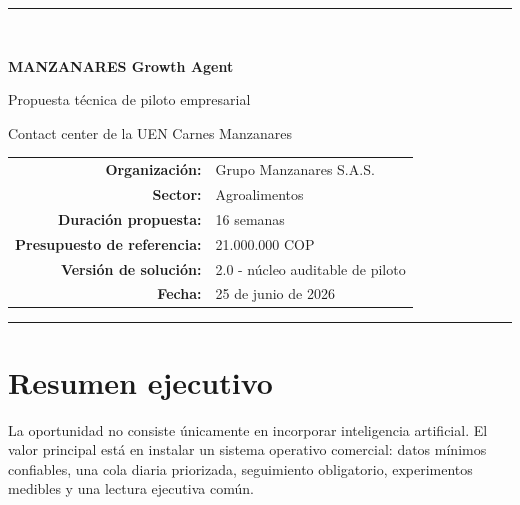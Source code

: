 \documentclass[11pt,a4paper]{article}
\begin{document}
\hypersetup{pageanchor=false}

\begin{titlepage}
\centering
\vspace*{1.6cm}
{\color{azulmanzanares}\rule{\textwidth}{2.5pt}}\\[1.2cm]
{\Huge\bfseries MANZANARES Growth Agent\par}
\vspace{0.35cm}
{\Large Propuesta técnica de piloto empresarial\par}
\vspace{0.25cm}
{\large Contact center de la UEN Carnes Manzanares\par}
\vspace{1.4cm}


\vfill
\begin{tabular}{rl}
\textbf{Organización:} & Grupo Manzanares S.A.S.\\
\textbf{Sector:} & Agroalimentos\\
\textbf{Duración propuesta:} & 16 semanas\\
\textbf{Presupuesto de referencia:} & 21.000.000 COP\\
\textbf{Versión de solución:} & 2.0 - núcleo auditable de piloto\\
\textbf{Fecha:} & 25 de junio de 2026\\
\end{tabular}
\vfill
{\color{azulmanzanares}\rule{\textwidth}{2.5pt}}
\end{titlepage}

\hypersetup{pageanchor=true}
\tableofcontents
\clearpage
{}

\section{Resumen ejecutivo}

La oportunidad no consiste únicamente en incorporar inteligencia artificial. El
valor principal está en instalar un sistema operativo comercial: datos mínimos
confiables, una cola diaria priorizada, seguimiento obligatorio, experimentos
medibles y una lectura ejecutiva común.
\end{document}
